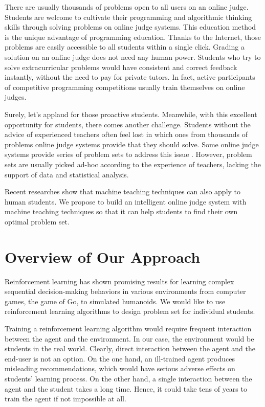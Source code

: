     There are usually thousands of problems open to all users on an online judge.
    Students are welcome to cultivate their programming and algorithmic thinking skills
    through solving problems on online judge systems.
    This education method is the unique advantage of programming education.
    Thanks to the Internet, those problems are easily accessible to all students within a single click.
    Grading a solution on an online judge does not need any human power.
    Students who try to solve extracurricular problems
    would have consistent and correct feedback instantly, without the need to pay for private tutors.
    In fact, active participants of competitive programming competitions usually train themselves on online judges.

    Surely, let's applaud for those proactive students.
    Meanwhile, with this excellent opportunity for students, there comes another challenge.
    Students without the advice of experienced teachers often feel lost in 
    which ones from thousands of problems online judge systems provide that they should solve.
    Some online judge systems provide series of problem sets to address this issue \cite{bez2014uri}.
    However, problem sets are usually picked ad-hoc according to the experience of teachers,
    lacking the support of data and statistical analysis.

    Recent researches \cite{Zhu2015,Zhu2018} show that
    machine teaching techniques can also apply to human students.
    We propose to build an intelligent online judge system with machine teaching techniques
    so that it can help students to find their own optimal problem set.

\section{Overview of Our Approach}

    Reinforcement learning has shown promising results for
    learning complex sequential decision-making behaviors in various environments
    from computer games, the game of Go, to simulated humanoids.
    We would like to use reinforcement learning algorithms to design problem set for individual students.

    Training a reinforcement learning algorithm would require
    frequent interaction between the agent and the environment.
    In our case, the environment would be students in the real world.
    Clearly, direct interaction between the agent and the end-user is not an option.
    On the one hand, an ill-trained agent produces misleading recommendations,
    which would have serious adverse effects on students' learning process.
    On the other hand, a single interaction between the agent and the student takes a long time.
    Hence, it could take tens of years to train the agent if not impossible at all.

